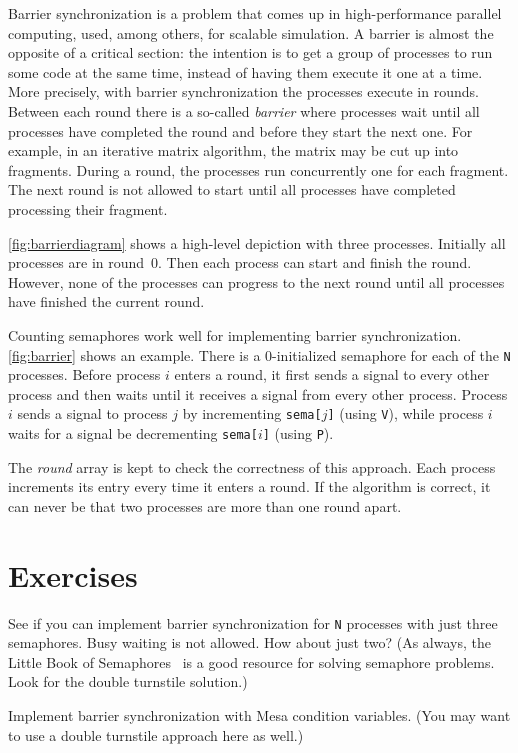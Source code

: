 \documentclass{report}
\begin{document}
Barrier synchronization is a problem that comes up in high-performance
parallel computing, used, among others, for scalable simulation.
A barrier is almost the opposite of a critical section:
the intention is to get a group of processes to run some code at the
same time, instead of having them execute it one at a time.
More precisely, with barrier synchronization the processes execute in rounds.
Between each round there is a so-called \emph{barrier} where processes wait
until all processes have completed the round and before they start the
next one.
For example, in an iterative matrix algorithm, the matrix may be
cut up into fragments.  During a round, the processes run concurrently
one for each fragment.  The next round is not allowed to start
until all processes have completed processing their fragment.

\autoref{fig:barrierdiagram} shows a high-level depiction with three
processes.  Initially all processes are in round~0.  Then each process
can start and finish the round.  However, none of the processes can
progress to the next round until all processes have finished the
current round.

Counting semaphores work well for implementing barrier synchronization.
\autoref{fig:barrier} shows an example.  There is a 0-initialized
semaphore for each of the \texttt{N} processes.
Before process $i$ enters a round, it first sends a signal to every
other process and then waits until it receives a signal from
every other process.  Process $i$ sends a signal to process $j$
by incrementing \texttt{sema[$j$]} (using \texttt{V}),
while process $i$ waits for a signal be decrementing \texttt{sema[$i$]}
(using \texttt{P}).

The \textit{round} array is kept to check the correctness of this
approach.  Each process increments its entry every time it enters
a round.  If the algorithm is correct, it can never be that two processes
are more than one round apart.

\section*{Exercises}
\begin{problems}
\item See if you can implement barrier synchronization for \texttt{N} processes
with just three semaphores.  Busy waiting is not allowed.  How about just two?
(As always, the Little Book of Semaphores~\cite{Downey09} is a good resource
for solving semaphore problems.  Look for the double turnstile solution.)
\item Implement barrier synchronization with Mesa condition variables.
(You may want to use a double turnstile approach here as well.)
\end{problems}
\end{document}
